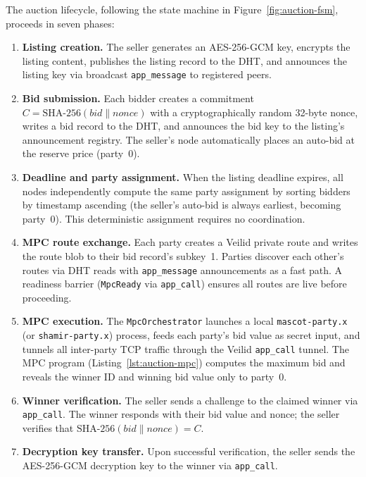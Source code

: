 The auction lifecycle, following the state machine in
Figure~\ref{fig:auction-fsm}, proceeds in seven phases:

\begin{enumerate}
  \item \textbf{Listing creation.}  The seller generates an AES-256-GCM key,
    encrypts the listing content, publishes the listing record to the DHT,
    and announces the listing key via broadcast \texttt{app\_message} to
    registered peers.

  \item \textbf{Bid submission.}  Each bidder creates a commitment
    $C = \text{SHA-256}(\mathit{bid} \| \mathit{nonce})$ with a
    cryptographically random 32-byte nonce, writes a bid record to the DHT,
    and announces the bid key to the listing's announcement registry.  The
    seller's node automatically places an auto-bid at the reserve price
    (party~0).

  \item \textbf{Deadline and party assignment.}  When the listing deadline
    expires, all nodes independently compute the same party assignment by
    sorting bidders by timestamp ascending (the seller's auto-bid is always
    earliest, becoming party~0).  This deterministic assignment requires no
    coordination.

  \item \textbf{MPC route exchange.}  Each party creates a Veilid private
    route and writes the route blob to their bid record's subkey~1.  Parties
    discover each other's routes via DHT reads with \texttt{app\_message}
    announcements as a fast path.  A readiness barrier
    (\texttt{MpcReady} via \texttt{app\_call}) ensures all routes are live
    before proceeding.

  \item \textbf{MPC execution.}  The \texttt{MpcOrchestrator} launches a
    local \texttt{mascot-party.x} (or \texttt{shamir-party.x}) process,
    feeds each party's bid value as secret input, and tunnels all inter-party
    TCP traffic through the Veilid \texttt{app\_call} tunnel.  The MPC
    program (Listing~\ref{lst:auction-mpc}) computes the maximum bid and
    reveals the winner ID and winning bid value only to party~0.

  \item \textbf{Winner verification.}  The seller sends a challenge to the
    claimed winner via \texttt{app\_call}.  The winner responds with their
    bid value and nonce; the seller verifies that
    $\text{SHA-256}(\mathit{bid} \| \mathit{nonce}) = C$.

  \item \textbf{Decryption key transfer.}  Upon successful verification, the
    seller sends the AES-256-GCM decryption key to the winner via
    \texttt{app\_call}.
\end{enumerate}


